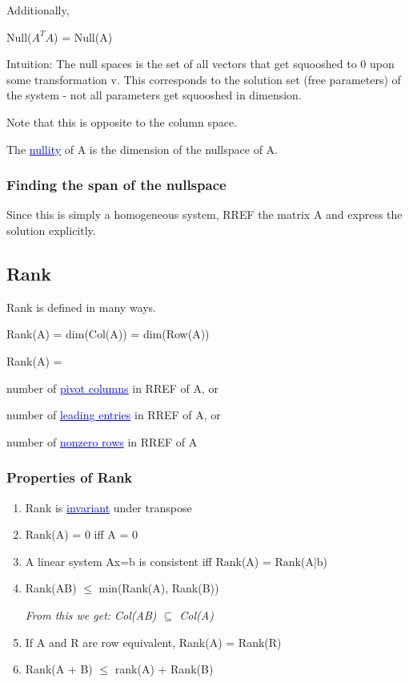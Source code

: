 \documentclass{article}
\newcommand{\bul}[1]{\textcolor{blue}{\underline{#1}}}
\newcommand{\sbreak}{\vspace{10pt}}
\begin{document}
Additionally,
\begin{center}
    Null($A^TA$) = Null(A)
\end{center}

Intuition: The null spaces is the set of all vectors that get squooshed to 0 upon some transformation v. This corresponds to the solution set (free parameters) of the system - not all parameters get squooshed in dimension.

Note that this is opposite to the column space.

The \bul{nullity} of A is the dimension of the nullspace of A.

\subsubsection{Finding the span of the nullspace}
Since this is simply a homogeneous system, RREF the matrix A and express the solution explicitly.

\subsection{Rank}
Rank is defined in many ways.
\begin{center}
    Rank(A) = dim(Col(A)) = dim(Row(A))  
\end{center}
\sbreak
Rank(A) =

number of \bul{pivot columns} in RREF of A, or

number of \bul{leading entries} in RREF of A, or

number of \bul{nonzero rows} in RREF of A


\subsubsection{Properties of Rank}
\begin{enumerate}
    \item Rank is \bul{invariant} under transpose
    \item Rank(A) = 0 iff A = 0
    \item A linear system Ax=b is consistent iff Rank(A) = Rank(A|b)
    \item Rank(AB) $\leq$ min(Rank(A), Rank(B))
    
    \textit{From this we get: Col(AB) $\subseteq$ Col(A)}
    \item If A and R are row equivalent, Rank(A) = Rank(R)
    \item Rank(A + B) $\leq$ rank(A) + Rank(B)
\end{enumerate}
\end{document}
